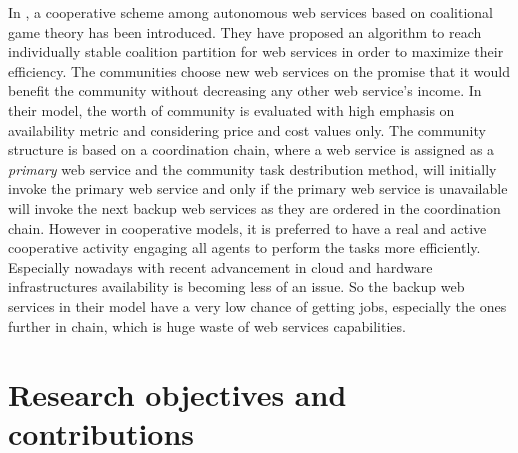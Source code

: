 In \cite{10.1109/TSC.2012.12}, a cooperative scheme among autonomous
web services based on coalitional game theory has been introduced. They have proposed an algorithm to
reach individually stable coalition partition for web services in order to
maximize their efficiency. The communities choose new web services on the promise
that it would benefit the community without decreasing any other web service's
income. In their model, the worth of community is evaluated with high emphasis on
availability metric and considering price and cost values only. The community structure is based on a coordination chain,
where a web service is assigned as a \emph{primary} web service and the community task destribution
method, will initially invoke the primary web service and only if the primary web service is unavailable
will invoke the next backup web services as they are ordered in the coordination chain. However in cooperative models, it is preferred to
have a real and active cooperative activity engaging all agents to perform the tasks more efficiently. Especially nowadays
with recent advancement in cloud and hardware infrastructures availability is becoming less of an issue. So the backup web services
in their model have a very low chance of getting jobs, especially the ones further in chain, which is huge waste of web services
capabilities.





\section{Research objectives and contributions}\label{sec:contribution}

